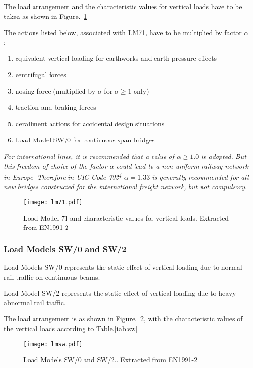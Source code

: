 The load arrangement and the characteristic values for vertical loads have to be taken as shown in Figure.~\ref{lm71}

The actions listed below, associated with LM71, have to be multiplied by factor $ \alpha $:

\begin{enumerate}[-]
	\item equivalent vertical loading for earthworks and earth pressure effects
	\item centrifugal forces
	\item nosing force (multiplied by $ \alpha $ for $ \alpha\geq 1 $ only)
	\item traction and braking forces
	\item derailment actions for accidental design situations
	\item Load Model SW/0 for continuous span bridges
\end{enumerate}

\textit{For international lines, it is recommended that a value of $ \alpha \geq 1.0 $ is adopted. But this freedom of choice of the factor $ \alpha $ could lead to a non-uniform railway network in Europe. Therefore in UIC Code 702\textsuperscript{4} $ \alpha=1.33 $ is generally recommended for all new bridges constructed for the international freight network, but not compulsory}. 

\begin{figure}[h]
	\centering
	\texttt{[image: lm71.pdf]}
	\caption{Load Model 71 and characteristic values for vertical loads. Extracted from EN1991-2\cite{EC12}}
	\label{lm71}
\end{figure}

\subsubsection{Load Models SW/0 and SW/2}
Load Models SW/0 represents the static effect of vertical loading due to normal rail traffic on continuous beams.

Load Model SW/2 represents the static effect of vertical loading due to heavy abnormal rail traffic. 

The load arrangement is as shown in Figure.~\ref{lmsw}, with the characteristic values of the vertical loads according to Table.\ref{tab:sw}

\begin{figure}[h]
	\centering
	\texttt{[image: lmsw.pdf]}
	\caption{Load Models SW/0 and SW/2.. Extracted from EN1991-2\cite{EC12}}
	\label{lmsw}
\end{figure}

